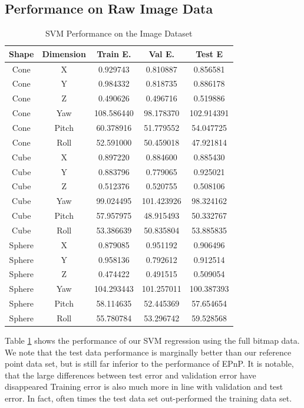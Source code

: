 \documentclass[journal]{IEEEtran}
\begin{document}
\subsection{Performance on Raw Image Data}

\begin{table}[h]
\caption{SVM Performance on the Image Dataset}
\label{SVM_Image}
\centering

\begin{tabular}{|c|c|c|c|c|}
\hline
Shape & Dimension & Train E. & Val E. & Test E\\
\hline
Cone & X & 0.929743 & 0.810887 & 0.856581\\
Cone & Y & 0.984332 & 0.818735 & 0.886178\\
Cone & Z & 0.490626 & 0.496716 & 0.519886\\
Cone & Yaw & 108.586440 & 98.178370 & 102.914391\\
Cone & Pitch & 60.378916 & 51.779552 & 54.047725\\
Cone & Roll & 52.591000 & 50.459018 & 47.921814\\
\hline
Cube & X & 0.897220 & 0.884600 & 0.885430\\
Cube & Y & 0.883796 & 0.779065 & 0.925021\\
Cube & Z & 0.512376 & 0.520755 & 0.508106\\
Cube & Yaw & 99.024495 & 101.423926 & 98.324162\\
Cube & Pitch & 57.957975 & 48.915493 & 50.332767\\
Cube & Roll & 53.386639 & 50.835804 & 53.885835\\
\hline
Sphere & X & 0.879085 & 0.951192 & 0.906496\\
Sphere & Y & 0.958136 & 0.792612 & 0.912514\\
Sphere & Z & 0.474422 & 0.491515 & 0.509054\\
Sphere & Yaw & 104.293443 & 101.257011 & 100.387393\\
Sphere & Pitch & 58.114635 & 52.445369 & 57.654654\\
Sphere & Roll & 55.780784 & 53.296742 & 59.528568\\
\hline
\end{tabular}

\end{table}

Table \ref{SVM_Image} shows the performance of our SVM regression using the full bitmap data. We note that the test data performance is marginally better than our reference point data set, but is still far inferior to the performance of EPnP. It is notable, that the large differences between test error and validation error have disappeared Training error is also much more in line with validation and test error. In fact, often times the test data set out-performed the training data set.
\end{document}
